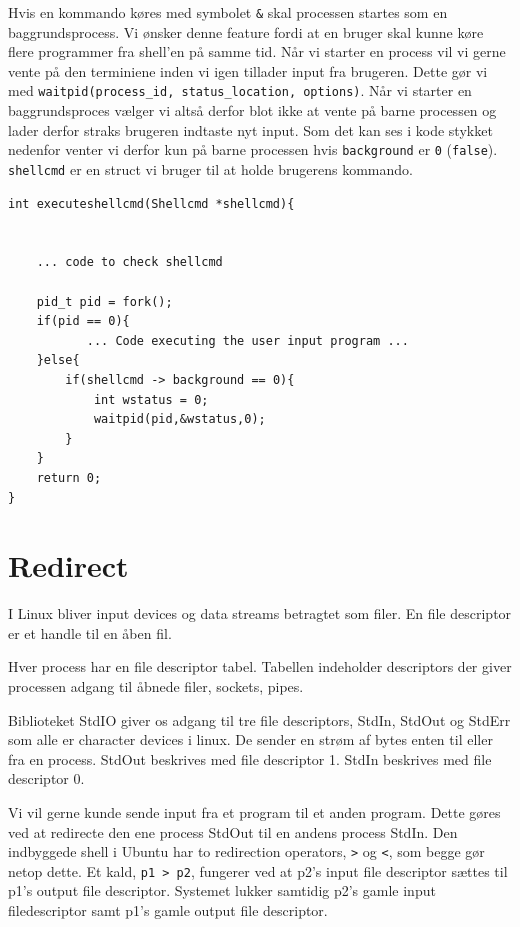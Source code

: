 \documentclass[danish]{report}
\begin{document}
Hvis en kommando køres med symbolet {\tt \&} skal processen startes som en baggrundsprocess. Vi ønsker denne feature fordi at en bruger skal kunne køre flere programmer fra shell'en på samme tid. Når vi starter en process vil vi gerne vente på den terminiene inden vi igen tillader input fra brugeren. Dette gør vi med {\tt waitpid(process\_id, status\_location, options)}. Når vi starter en baggrundsproces vælger vi altså derfor blot ikke at vente på barne processen og lader derfor straks brugeren indtaste nyt input. Som det kan ses i kode stykket nedenfor venter vi derfor kun på barne processen hvis {\tt background} er {\tt 0} ({\tt false}). {\tt shellcmd} er en struct vi bruger til at holde brugerens kommando. 
\begin{lstlisting}
int executeshellcmd(Shellcmd *shellcmd){
    

    ... code to check shellcmd

    pid_t pid = fork();
    if(pid == 0){
           ... Code executing the user input program ...
    }else{
        if(shellcmd -> background == 0){
            int wstatus = 0;    
            waitpid(pid,&wstatus,0);
        }
    }
    return 0;
}
\end{lstlisting}

\section{Redirect}
\label{redirect}
I Linux bliver input devices og data streams betragtet som filer. En file descriptor er et handle til en åben fil.

Hver process har en file descriptor tabel. Tabellen indeholder descriptors der giver processen adgang til åbnede filer, sockets, pipes.   

Biblioteket StdIO giver os adgang til tre file descriptors, StdIn, StdOut og StdErr som alle er character devices i linux. De sender en strøm af bytes enten til eller fra en process. StdOut  beskrives med file descriptor 1. StdIn beskrives med file descriptor 0. 

Vi vil gerne kunde sende input fra et program til et anden program. Dette gøres ved at redirecte den ene process StdOut til en andens process StdIn. Den indbyggede shell i Ubuntu har to redirection operators, {\tt >} og {\tt <}, som begge gør netop dette. Et kald, {\tt p1 > p2}, fungerer ved at p2's input file descriptor sættes til p1's output file descriptor. Systemet lukker samtidig p2's gamle input filedescriptor samt p1's gamle output file descriptor. 
\end{document}
